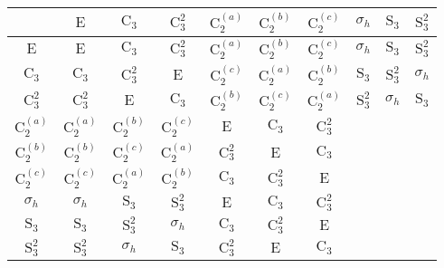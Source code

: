 \begin{tabular}{c|ccccccccc}
\toprule
 & $\mathrm{E}$ & $\mathrm{C}_{3}$ & $\mathrm{C}_{3}^{2}$ & $\mathrm{C}_{2}^{(a)}$ & $\mathrm{C}_{2}^{(b)}$ & $\mathrm{C}_{2}^{(c)}$ & $\sigma_{h}$ & $\mathrm{S}_{3}$ & $\mathrm{S}_{3}^{2}$ \\
\midrule
$\mathrm{E}$ & $\mathrm{E}$ & $\mathrm{C}_{3}$ & $\mathrm{C}_{3}^{2}$ & $\mathrm{C}_{2}^{(a)}$ & $\mathrm{C}_{2}^{(b)}$ & $\mathrm{C}_{2}^{(c)}$ & $\sigma_{h}$ & $\mathrm{S}_{3}$ & $\mathrm{S}_{3}^{2}$ \\
$\mathrm{C}_{3}$ & $\mathrm{C}_{3}$ & $\mathrm{C}_{3}^{2}$ & $\mathrm{E}$ & $\mathrm{C}_{2}^{(c)}$ & $\mathrm{C}_{2}^{(a)}$ & $\mathrm{C}_{2}^{(b)}$ & $\mathrm{S}_{3}$ & $\mathrm{S}_{3}^{2}$ & $\sigma_{h}$ \\
$\mathrm{C}_{3}^{2}$ & $\mathrm{C}_{3}^{2}$ & $\mathrm{E}$ & $\mathrm{C}_{3}$ & $\mathrm{C}_{2}^{(b)}$ & $\mathrm{C}_{2}^{(c)}$ & $\mathrm{C}_{2}^{(a)}$ & $\mathrm{S}_{3}^{2}$ & $\sigma_{h}$ & $\mathrm{S}_{3}$ \\
$\mathrm{C}_{2}^{(a)}$ & $\mathrm{C}_{2}^{(a)}$ & $\mathrm{C}_{2}^{(b)}$ & $\mathrm{C}_{2}^{(c)}$ & $\mathrm{E}$ & $\mathrm{C}_{3}$ & $\mathrm{C}_{3}^{2}$ \\
$\mathrm{C}_{2}^{(b)}$ & $\mathrm{C}_{2}^{(b)}$ & $\mathrm{C}_{2}^{(c)}$ & $\mathrm{C}_{2}^{(a)}$ & $\mathrm{C}_{3}^{2}$ & $\mathrm{E}$ & $\mathrm{C}_{3}$ \\
$\mathrm{C}_{2}^{(c)}$ & $\mathrm{C}_{2}^{(c)}$ & $\mathrm{C}_{2}^{(a)}$ & $\mathrm{C}_{2}^{(b)}$ & $\mathrm{C}_{3}$ & $\mathrm{C}_{3}^{2}$ & $\mathrm{E}$ \\
$\sigma_{h}$ & $\sigma_{h}$ & $\mathrm{S}_{3}$ & $\mathrm{S}_{3}^{2}$ & $\mathrm{E}$ & $\mathrm{C}_{3}$ & $\mathrm{C}_{3}^{2}$ \\
$\mathrm{S}_{3}$ & $\mathrm{S}_{3}$ & $\mathrm{S}_{3}^{2}$ & $\sigma_{h}$ & $\mathrm{C}_{3}$ & $\mathrm{C}_{3}^{2}$ & $\mathrm{E}$ \\
$\mathrm{S}_{3}^{2}$ & $\mathrm{S}_{3}^{2}$ & $\sigma_{h}$ & $\mathrm{S}_{3}$ & $\mathrm{C}_{3}^{2}$ & $\mathrm{E}$ & $\mathrm{C}_{3}$ \\
\bottomrule
\end{tabular}